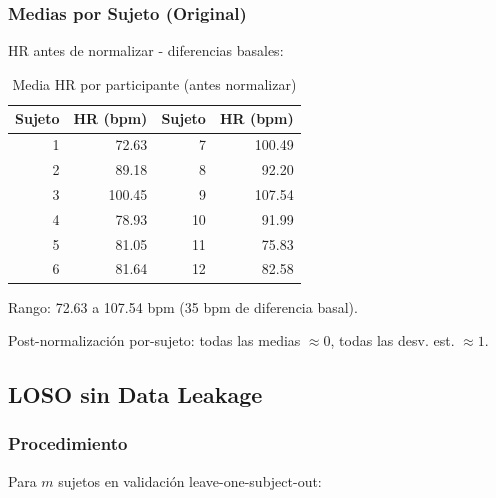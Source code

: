 \documentclass[11pt,twoside,a4paper]{article}
\begin{document}
\subsubsection{Medias por Sujeto (Original)}

HR antes de normalizar - diferencias basales:

\begin{table}[H]
\centering
\caption{Media HR por participante (antes normalizar)}
\label{tab:norm_subj_before}
\begin{tabular}{|r|r|r|r|}
\hline
Sujeto & HR (bpm) & Sujeto & HR (bpm) \\
\hline
1 & 72.63 & 7 & 100.49 \\
2 & 89.18 & 8 & 92.20 \\
3 & 100.45 & 9 & 107.54 \\
4 & 78.93 & 10 & 91.99 \\
5 & 81.05 & 11 & 75.83 \\
6 & 81.64 & 12 & 82.58 \\
\hline
\end{tabular}
\end{table}

Rango: 72.63 a 107.54 bpm (35 bpm de diferencia basal).

Post-normalización por-sujeto: todas las medias $\approx 0$, todas las desv. est. $\approx 1$.

\subsection{LOSO sin Data Leakage}

\subsubsection{Procedimiento}

Para $m$ sujetos en validación leave-one-subject-out:
\end{document}
